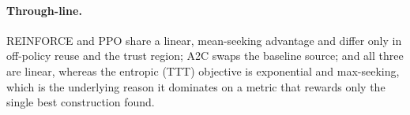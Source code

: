 \paragraph{Through-line.}
REINFORCE and PPO share a linear, mean-seeking advantage and differ only in
off-policy reuse and the trust region; A2C swaps the baseline source; and all
three are linear, whereas the entropic (TTT) objective is exponential and
max-seeking, which is the underlying reason it dominates on a metric that rewards
only the single best construction found.